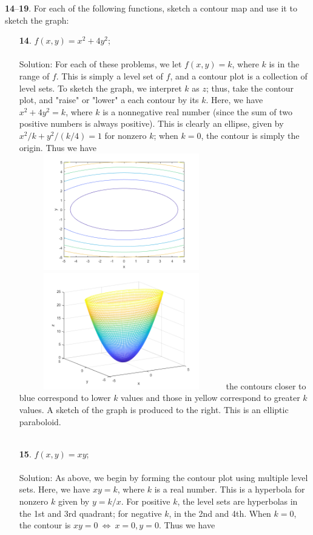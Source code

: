 \documentclass[12pt]{amsbook}
\begin{document}
\noindent
{\small {\bf 14}--{\bf 19}}. For each of the following functions, sketch a contour map and use
it to sketch the graph:
\begin{enumerate}
  \item[{\small\bf 14}.] $f(x,y)=x^2+4y^2$;
  \\
  \\
  {\sc Solution}: For each of these problems, we let $f(x,y)=k$, where $k$ is in the range of $f$. This is simply a level set of $f$, and a contour plot is a collection of level sets. To sketch the graph, we interpret $k$ as $z$; thus, take the contour plot, and "raise" or "lower" a each contour by its $k$. Here, we have $x^2+4y^2=k$, where $k$ is a nonnegative real number (since the sum of two positive numbers is always positive). This is clearly an ellipse, given by $x^2/k+y^2/(k/4)=1$ for nonzero $k$; when $k=0$, the contour is simply the origin. Thus we have
  \\
  \includegraphics[width=3.5in,height=2.0in]{3_1_14_1.png}
  \includegraphics[width=3.5in,height=2.0in]{3_1_14_2.png}
  the contours closer to blue correspond to lower $k$ values and those in yellow correspond to greater $k$ values. A sketch of the graph is produced to the right. This is an elliptic paraboloid.
  \\
  \\
  \item[{\small\bf 15}.] $f(x,y)=xy$;
  \\
  \\
  {\sc Solution}: As above, we begin by forming the contour plot using multiple level sets. Here, we have $xy=k$, where $k$ is a real number. This is a hyperbola for nonzero $k$ given by $y=k/x$. For positive $k$, the level sets are hyperbolas in the 1st and 3rd quadrant; for negative $k$, in the 2nd and 4th. When $k=0$, the contour is $xy=0 \ \Leftrightarrow \ x=0,y=0$. Thus we have

\end{enumerate}
\end{document}
